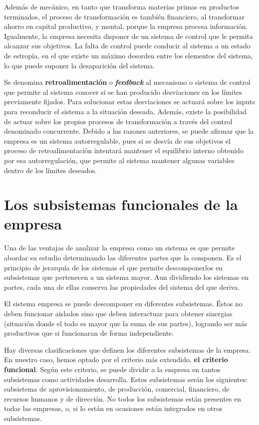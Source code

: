 \documentclass[12pt,a4paper,spanish]{report}
\begin{document}
			Además de mecánico, en tanto que transforma materias primas en productos terminados, el proceso de transformación es también financiero, al transformar ahorro en capital productivo, y mental, porque la empresa procesa información. Igualmente, la empresa necesita disponer de un sistema de control que le permita alcanzar sus objetivos. La falta de control puede conducir al sistema a un estado de estropía, en el que existe un máximo desorden entre los elementos del sistema, lo que puede suponer la desaparición del sistema.

			Se denomina \textbf{retroalimentación} o \textcolor[rgb]{0.5,0.8,0.9}{\textbf{\emph{feedback}}} al mecanismo o sistema de control que permite al sistema conocer si se han producido desviaciones en los límites previamente fijados. Para solucionar estas desviaciones se actuará sobre los inputs para reconducir el sistema a la situación deseada. Además, existe la posibilidad de actuar sobre los propios procesos de transformación a través  del control denominado concurrente. Debido a las razones anteriores, se puede afirmar que la empresa es un sistema autorregulable, pues si se desvía de sus objetivos el proceso de retroalimentación intentará mantener el equilibrio interno obtenido por esa autorregulación, que permite al sistema mantener algunas variables dentro de los límites deseados.

		\section{\textcolor[rgb]{0.5,0.8,0.9}Los subsistemas funcionales de la empresa}
			Una de las ventajas de analizar la empresa como un sistema es que permite abordar su estudio determinando las diferentes partes que la componen. Es el principio de jerarquía de los sistemas el que permite descomponerlos en subsistemas que pertenecen a un sistema mayor. Aun dividiendo los sistemas en partes, cada una de ellas conserva las propiedades del sistema del que deriva.

			El sistema empresa se puede descomponer en diferentes subsistemas. Éstos no deben funcionar aislados sino que deben interactuar para obtener sinergias (situación donde el todo es mayor que la suma de sus partes), logrando ser más productivos que si funcionaran de forma independiente.

			Hay diversas clasificaciones que definen los diferentes subsistemas de la empresa. En nuestro caso, hemos optado por el criterio más extendido, \textbf{el criterio funcional}. Según este criterio, se puede dividir a la empresa en tantos subsistemas como actividades desarrolla. Estos subsistemas serán los siguientes: subsistema de aprovisionamiento, de producción, comercial, financiero, de recursos humanos y de dirección. No todos los subsistemas están presentes en todas las empresas, o, si lo están en ocasiones están integrados en otros subsistemas.
\end{document}
